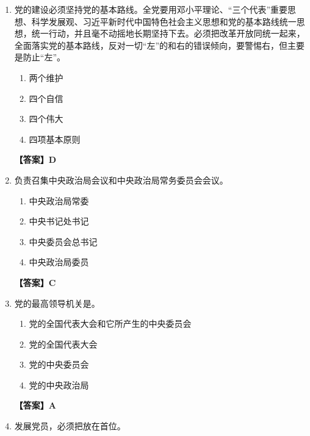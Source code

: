 \documentclass[UTF8,11pt,a4paper]{ctexart}
\begin{document}
\begin{enumerate}[label=\textbf{\arabic*.}, leftmargin=2.5em, itemsep=0.7em]
\begin{enumerate}[label=\Alph*., leftmargin=2em, itemsep=0.1em, topsep=0.15em]
\item 教育、科技、人才
\item 教育、科技、创新
\item 科教、人才、创新
\item 科技、人才、创新
\end{enumerate}
\textbf{【答案】A}
\item 党的建设必须坚持党的基本路线。全党要用邓小平理论、“三个代表”重要思想、科学发展观、习近平新时代中国特色社会主义思想和党的基本路线统一思想，统一行动，并且毫不动摇地长期坚持下去。必须把改革开放同\allowbreak\underline{\hspace{4em}}统一起来，全面落实党的基本路线，反对一切“左”的和右的错误倾向，要警惕右，但主要是防止“左”。
\begin{enumerate}[label=\Alph*., leftmargin=2em, itemsep=0.1em, topsep=0.15em]
\item 两个维护
\item 四个自信
\item 四个伟大
\item 四项基本原则
\end{enumerate}
\textbf{【答案】D}
\item \allowbreak\underline{\hspace{4em}}负责召集中央政治局会议和中央政治局常务委员会会议。
\begin{enumerate}[label=\Alph*., leftmargin=2em, itemsep=0.1em, topsep=0.15em]
\item 中央政治局常委
\item 中央书记处书记
\item 中央委员会总书记
\item 中央政治局委员
\end{enumerate}
\textbf{【答案】C}
\item 党的最高领导机关是\allowbreak\underline{\hspace{4em}}。
\begin{enumerate}[label=\Alph*., leftmargin=2em, itemsep=0.1em, topsep=0.15em]
\item 党的全国代表大会和它所产生的中央委员会
\item 党的全国代表大会
\item 党的中央委员会
\item 党的中央政治局
\end{enumerate}
\textbf{【答案】A}
\item 发展党员，必须把\allowbreak\underline{\hspace{4em}}放在首位。
\begin{enumerate}[label=\Alph*., leftmargin=2em, itemsep=0.1em, topsep=0.15em]

\end{enumerate}
\end{enumerate}
\end{document}
